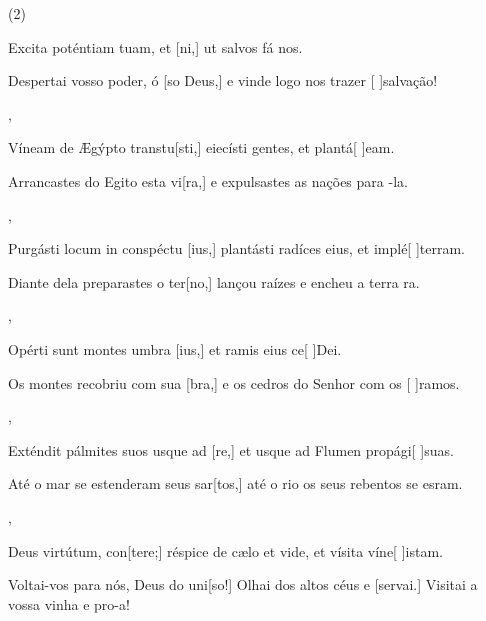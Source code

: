\SetVersePairs(2){
  {\item {}Excita poténtiam tuam, et [ni,] ut salvos fá nos.~\Responsorium}%
    {\item {}Despertai vosso poder, ó [so Deus,] e vinde logo nos trazer [ ]{sal}vação!~\Responsorium},
  {\item {}Víneam de Ægýpto transtu[sti,] eiecísti gentes, et plantá[ ]{e}am.~\Responsorium}%
    {\item {}Arrancastes do Egito esta vi[ra,] e expulsastes as nações para -la.~\Responsorium},
  {\item {}Purgásti locum in conspéctu [ius,] plantásti radíces eius, et implé[ ]{ter}ram.~\Responsorium}%
    {\item {}Diante dela preparastes o ter[no,] lançou raízes e encheu a terra ra.~\Responsorium},
  {\item {}Opérti sunt montes umbra [ius,] et ramis eius ce[ ]{De}i.~\Responsorium}%
    {\item {}Os montes recobriu com sua [bra,] e os cedros do Senhor com os [ ]{ra}mos.~\Responsorium},
  {\item {}Exténdit pálmites suos usque ad [re,] et usque ad Flumen propági[ ]{su}as.~\Responsorium}%
    {\item {}Até o mar se estenderam seus sar[tos,] até o rio os seus rebentos se esram.~\Responsorium},
  {\item {}Deus virtútum, con[tere;] réspice de cæ\-lo et vide, et vísita víne[ ]{i}stam.~\Responsorium}%
    {\item {}Voltai-vos para nós, Deus do uni[so!] Olhai dos altos céus e [servai.] Visitai a vossa vinha e pro-a!~\Responsorium}
}